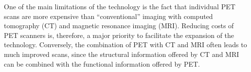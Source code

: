 One of the main limitations of the technology is the fact that  individual PET scans are more expensive than ``conventional'' imaging with computed tomography (CT) and magnetic resonance imaging (MRI). Reducing costs of PET scanners is, therefore, a major priority to facilitate the expansion of the technology. Conversely, the combination of PET with CT and MRI often leads to much improved scans, since the structural information offered by CT and MRI can be combined with the functional information offered by PET. 

